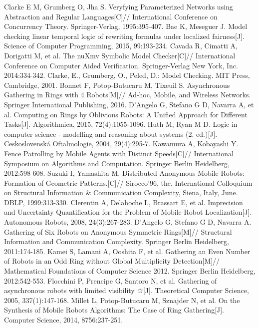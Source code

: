 \begin{thebibliography}{0}
   Clarke E M, Grumberg O, Jha S. Veryfying Parameterized Networks using Abstraction and Regular Languages[C]// International Conference on Concurrency Theory. Springer-Verlag, 1995:395-407.
   Bae K, Meseguer J. Model checking linear temporal logic of rewriting formulas under localized fairness[J]. Science of Computer Programming, 2015, 99:193-234.
   Cavada R, Cimatti A, Dorigatti M, et al. The nuXmv Symbolic Model Checker[C]// International Conference on Computer Aided Verification. Springer-Verlag New York, Inc. 2014:334-342.
   Clarke, E., Grumberg, O., Peled, D.: Model Checking. MIT Press, Cambridge, 2001.
   Bonnet F, Potop-Butucaru M, Tixeuil S. Asynchronous Gathering in Rings with 4 Robots[M]// Ad-hoc, Mobile, and Wireless Networks. Springer International Publishing, 2016.
   D’Angelo G, Stefano G D, Navarra A, et al. Computing on Rings by Oblivious Robots: A Unified Approach for Different Tasks[J]. Algorithmica, 2015, 72(4):1055-1096.
   Huth M, Ryan M D. Logic in computer science - modelling and reasoning about systems (2. ed.)[J]. Ceskoslovenská Oftalmologie, 2004, 29(4):295-7.
   Kawamura A, Kobayashi Y. Fence Patrolling by Mobile Agents with Distinct Speeds[C]// International Symposium on Algorithms and Computation. Springer Berlin Heidelberg, 2012:598-608.
   Suzuki I, Yamashita M. Distributed Anonymous Mobile Robots: Formation of Geometric Patterns.[C]// Sirocco'96, the, International Colloquium on Structural Information & Communication Complexity, Siena, Italy, June. DBLP, 1999:313-330.
   Clerentin A, Delahoche L, Brassart E, et al. Imprecision and Uncertainty Quantification for the Problem of Mobile Robot Localization[J]. Autonomous Robots, 2008, 24(3):267-283.
   D'Angelo G, Stefano G D, Navarra A. Gathering of Six Robots on Anonymous Symmetric Rings[M]// Structural Information and Communication Complexity. Springer Berlin Heidelberg, 2011:174-185.
   Kamei S, Lamani A, Ooshita F, et al. Gathering an Even Number of Robots in an Odd Ring without Global Multiplicity Detection[M]// Mathematical Foundations of Computer Science 2012. Springer Berlin Heidelberg, 2012:542-553.
   Flocchini P, Prencipe G, Santoro N, et al. Gathering of asynchronous robots with limited visibility ☆[J]. Theoretical Computer Science, 2005, 337(1):147-168.
   Millet L, Potop-Butucaru M, Sznajder N, et al. On the Synthesis of Mobile Robots Algorithms: The Case of Ring Gathering[J]. Computer Science, 2014, 8756:237-251.

\end{thebibliography}
